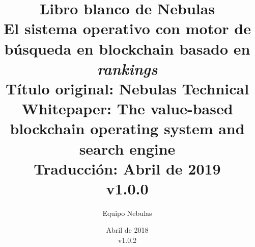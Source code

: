 \documentclass[11.5pt]{article}
\begin{document}
\renewcommand\contentsname{Tabla de contenidos}
\renewcommand\refname{Referencias}
\renewcommand\appendixname{Anexo}
\renewcommand\appendixpagename{Anexos}
\renewcommand{\abstractname}{Resumen}
\renewcommand{\nomname}{Glosario}
\renewcommand{\figurename}{Fig.}
\renewcommand{\tablename}{Tabla}
\renewcommand{\baselinestretch}{1.5}
\newcommand{\dapp}{DApp\xspace}
\newcommand{\pidc}{Protocolo de Incentivos para Desarrolladores\xspace}

\title{
	Libro blanco de Nebulas \\
	\large El sistema operativo con motor de búsqueda en blockchain basado en \textit{rankings}\\
	\small Título original: Nebulas Technical Whitepaper: The value-based blockchain operating system and search engine\\
	\small Traducción: Abril de 2019\\v1.0.0}
\author{Equipo Nebulas}
\date{Abril de 2018\\v1.0.2}

\maketitle

\newpage
\tableofcontents

\printnomenclature

\newpage
\newpage
\newpage
\newpage
\newpage
\newpage
\newpage
\newpage
\newpage

\begin{appendices}
\end{appendices}
\end{document}
